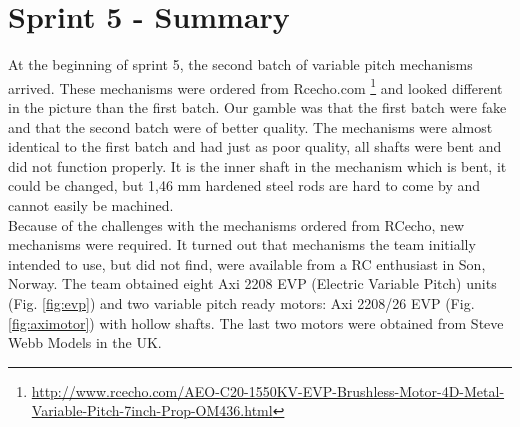 \chapter{Sprint 5 - Summary}

At the beginning of sprint 5, the second batch of variable pitch mechanisms arrived. These mechanisms were ordered from Rcecho.com \footnote{\url{http://www.rcecho.com/AEO-C20-1550KV-EVP-Brushless-Motor-4D-Metal-Variable-Pitch-7inch-Prop-OM436.html}} and looked different in the picture than the first batch. Our gamble was that the first batch were fake and that the second batch were of better quality.
The mechanisms were almost identical to the first batch and had just as poor quality, all shafts were bent and did not function properly. It is the inner shaft in the mechanism which is bent, it could be changed, but 1,46 mm hardened steel rods are hard to come by and cannot easily be machined. \bigskip
\\ 
Because of the challenges with the mechanisms ordered from RCecho, new mechanisms were required. It turned out that mechanisms the team initially intended to use, but did not find, were available from a RC enthusiast in Son, Norway. The team obtained eight Axi 2208 EVP (Electric Variable Pitch) units (Fig. \ref{fig:evp}) and two variable pitch ready motors: Axi 2208/26 EVP (Fig. \ref{fig:aximotor}) with hollow shafts. The last two motors were obtained from Steve Webb Models in the UK. \bigskip

